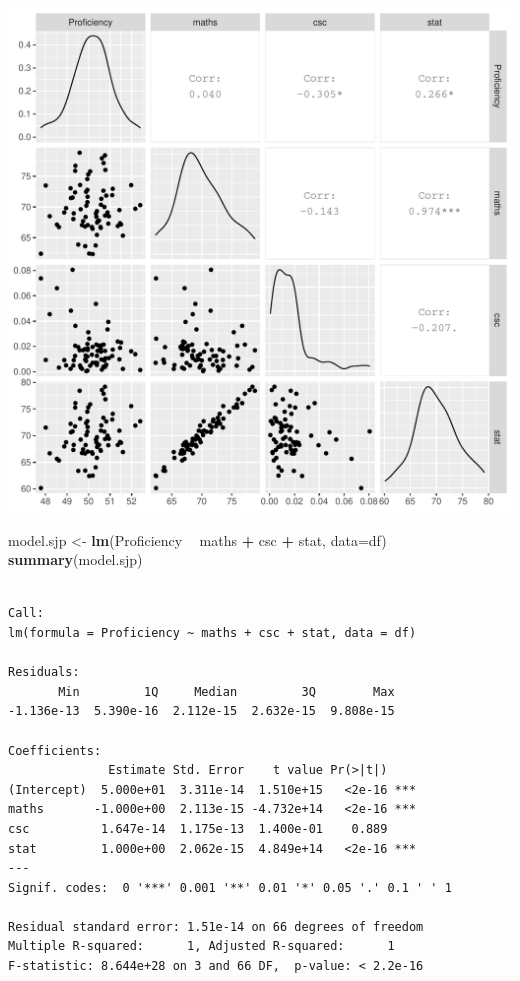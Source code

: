 \documentclass[]{article}
\newenvironment{Shaded}{\begin{snugshade}}{\end{snugshade}}
\newcommand{\DataTypeTok}[1]{\textcolor[rgb]{0.13,0.29,0.53}{#1}}
\newcommand{\KeywordTok}[1]{\textcolor[rgb]{0.13,0.29,0.53}{\textbf{#1}}}
\newcommand{\NormalTok}[1]{#1}
\newcommand{\OperatorTok}[1]{\textcolor[rgb]{0.81,0.36,0.00}{\textbf{#1}}}
\newcommand{\StringTok}[1]{\textcolor[rgb]{0.31,0.60,0.02}{#1}}
\begin{document}
\includegraphics{modelquestions_discussions_files/figure-latex/unnamed-chunk-7-1.pdf}

\begin{Shaded}
\begin{Highlighting}[]
\NormalTok{model.sjp <-}\StringTok{ }\KeywordTok{lm}\NormalTok{(Proficiency }\OperatorTok{~}\StringTok{ }\NormalTok{maths }\OperatorTok{+}\StringTok{ }\NormalTok{csc }\OperatorTok{+}\StringTok{ }\NormalTok{stat, }\DataTypeTok{data=}\NormalTok{df)}
\KeywordTok{summary}\NormalTok{(model.sjp)}
\end{Highlighting}
\end{Shaded}

\begin{verbatim}

Call:
lm(formula = Proficiency ~ maths + csc + stat, data = df)

Residuals:
       Min         1Q     Median         3Q        Max 
-1.136e-13  5.390e-16  2.112e-15  2.632e-15  9.808e-15 

Coefficients:
              Estimate Std. Error    t value Pr(>|t|)    
(Intercept)  5.000e+01  3.311e-14  1.510e+15   <2e-16 ***
maths       -1.000e+00  2.113e-15 -4.732e+14   <2e-16 ***
csc          1.647e-14  1.175e-13  1.400e-01    0.889    
stat         1.000e+00  2.062e-15  4.849e+14   <2e-16 ***
---
Signif. codes:  0 '***' 0.001 '**' 0.01 '*' 0.05 '.' 0.1 ' ' 1

Residual standard error: 1.51e-14 on 66 degrees of freedom
Multiple R-squared:      1, Adjusted R-squared:      1 
F-statistic: 8.644e+28 on 3 and 66 DF,  p-value: < 2.2e-16
\end{verbatim}
\end{document}
